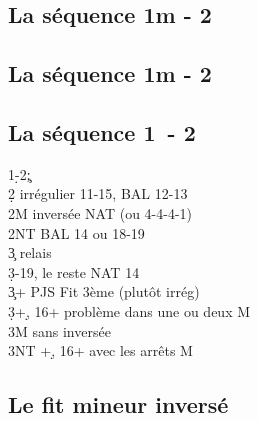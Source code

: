 \documentclass[a4paper]{article}
\begin{document}
\subsection{La séquence 1m - 2\pdfh}

\subsection{La séquence 1m - 2\pdfs}

\subsection{La séquence 1\pdfd\ - 2\pdfc}

\begin{bidtable}
1\d-2\c;\\
2\d \> irrégulier 11-15, BAL 12-13\\
2M \> inversée NAT (ou 4-4-4-1)\\
2NT \> BAL 14 ou 18-19\+\\
3\c \> relais\+\\
3\d {}-19, le reste NAT 14\-\-\\
3\c {}+ PJS Fit 3ème (plutôt irrég)\\
3\d {}+\d , 16+ problème dans une ou deux M\\
3M  sans inversée\\
3NT +\d , 16+ avec les arrêts M
\end{bidtable}

\subsection{Le fit mineur inversé}
\end{document}
